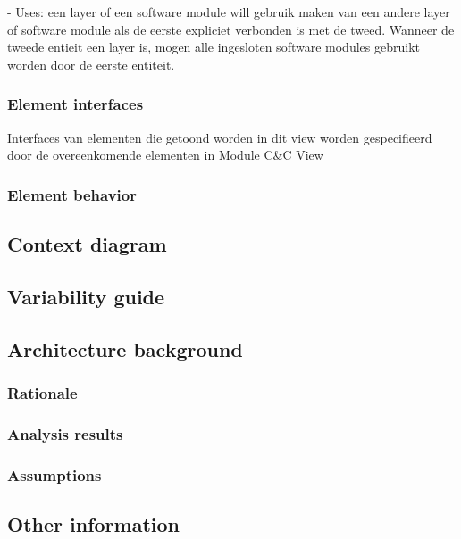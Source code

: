 \documentclass[a4paper,10pt]{article}
\begin{document}
- Uses: een layer of een software module will gebruik maken van een andere layer of software module als de eerste expliciet verbonden is met de tweed. Wanneer de tweede entieit een layer is, mogen alle ingesloten software modules gebruikt worden door de eerste entiteit.\\

\subsubsection{Element interfaces}

Interfaces van elementen die getoond worden in dit view worden gespecifieerd door de overeenkomende elementen in Module C\&C View\\

\subsubsection{Element behavior}

\subsection{Context diagram}

\subsection{Variability guide}

\subsection{Architecture background}

\subsubsection{Rationale}

\subsubsection{Analysis results}

\subsubsection{Assumptions}

\subsection{Other information}
\end{document}
